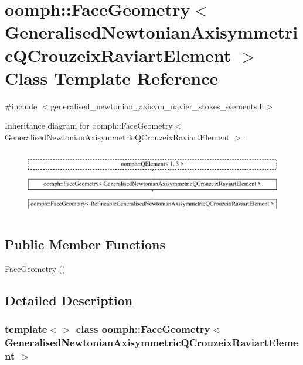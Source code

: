 \hypertarget{classoomph_1_1FaceGeometry_3_01GeneralisedNewtonianAxisymmetricQCrouzeixRaviartElement_01_4}{}\section{oomph\+:\+:Face\+Geometry$<$ Generalised\+Newtonian\+Axisymmetric\+Q\+Crouzeix\+Raviart\+Element $>$ Class Template Reference}
\label{classoomph_1_1FaceGeometry_3_01GeneralisedNewtonianAxisymmetricQCrouzeixRaviartElement_01_4}


{\ttfamily \#include $<$generalised\+\_\+newtonian\+\_\+axisym\+\_\+navier\+\_\+stokes\+\_\+elements.\+h$>$}

Inheritance diagram for oomph\+:\+:Face\+Geometry$<$ Generalised\+Newtonian\+Axisymmetric\+Q\+Crouzeix\+Raviart\+Element $>$\+:\begin{figure}[H]
\begin{center}
\leavevmode
\includegraphics[height=2.921739cm]{classoomph_1_1FaceGeometry_3_01GeneralisedNewtonianAxisymmetricQCrouzeixRaviartElement_01_4}
\end{center}
\end{figure}
\subsection*{Public Member Functions}
\begin{DoxyCompactItemize}
\item 
\hyperlink{classoomph_1_1FaceGeometry_3_01GeneralisedNewtonianAxisymmetricQCrouzeixRaviartElement_01_4_aa0cf7d24b41dc1e0036602fb703b4e1b}{Face\+Geometry} ()
\end{DoxyCompactItemize}


\subsection{Detailed Description}
\subsubsection*{template$<$$>$\newline
class oomph\+::\+Face\+Geometry$<$ Generalised\+Newtonian\+Axisymmetric\+Q\+Crouzeix\+Raviart\+Element $>$}

